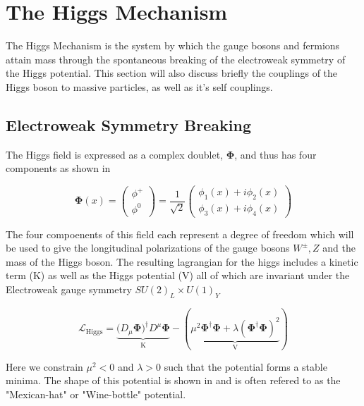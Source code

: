 \section{The Higgs Mechanism} \label{sec:theory:higgs}

The Higgs Mechanism is the system by which the gauge bosons and fermions attain
mass through the spontaneous breaking of the electroweak symmetry of the Higgs
potential.  This section will also discuss briefly the couplings of the Higgs
boson to massive particles, as well as it's self couplings.

\subsection{Electroweak Symmetry Breaking}

The Higgs field is expressed as a complex doublet, $\boldsymbol{\Phi}$, and thus
has four components as shown in 

\begin{equation} \label{eq:higgs:higgs_field}
\boldsymbol{\Phi}(x) = \left( \begin{matrix} \phi^{+} \\ \phi^{0} \end{matrix}
\right) = \frac{1}{\sqrt{2}} \left( \begin{matrix} \phi_{1}(x) + i\phi_{2}(x) \\
\phi_{3}(x) + i\phi_{4}(x) \end{matrix} \right)
\end{equation}

The four compoenents of this field each represent a degree of freedom which will
be used to give the longitudinal polarizations of the gauge bosons $W^{\pm},Z$
and the mass of the Higgs boson.  The resulting lagrangian for the higgs
includes a kinetic term (K) as well as the Higgs potential (V) all of which are
invariant under the Electroweak gauge symmetry $SU(2)_L \times U(1)_Y$

\begin{equation} \label{eq:higgs:lagrangian}
\mathcal{L}_{\text{Higgs}} =
\underbrace{(D_{\mu}\boldsymbol{\Phi)^{\dagger}}D^{\mu}\boldsymbol{\Phi}}_{\text{K}}
- (\underbrace{\mu^{2}\boldsymbol{\Phi}^{\dagger}\boldsymbol{\Phi} +
  \lambda(\boldsymbol{\Phi}^{\dagger}\boldsymbol{\Phi})^{2}}_{\text{V}})
\end{equation}

Here we constrain $\mu^{2} < 0$ and $\lambda > 0$ such that the potential forms
a stable minima.  The shape of this potential is shown in
 and is often refered to as the "Mexican-hat" or
"Wine-bottle" potential. 

